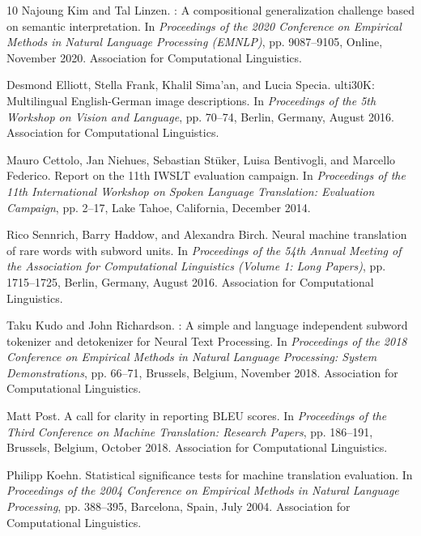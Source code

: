 \documentclass{nlp2026}
\begin{document}
\begin{thebibliography}{10}
Najoung Kim and Tal Linzen.
: A compositional generalization challenge based on semantic interpretation.
\newblock In {\em Proceedings of the 2020 Conference on Empirical Methods in Natural Language Processing ({EMNLP})}, pp. 9087--9105, Online, November 2020. Association for Computational Linguistics.

Desmond Elliott, Stella Frank, Khalil Sima{'}an, and Lucia Specia.
ulti30{K}: Multilingual {E}nglish-{G}erman image descriptions.
\newblock In {\em Proceedings of the 5th Workshop on Vision and Language}, pp. 70--74, Berlin, Germany, August 2016. Association for Computational Linguistics.

Mauro Cettolo, Jan Niehues, Sebastian St{\"u}ker, Luisa Bentivogli, and Marcello Federico.
\newblock Report on the 11th {IWSLT} evaluation campaign.
\newblock In {\em Proceedings of the 11th International Workshop on Spoken Language Translation: Evaluation Campaign}, pp. 2--17, Lake Tahoe, California, December 2014.

Rico Sennrich, Barry Haddow, and Alexandra Birch.
\newblock Neural machine translation of rare words with subword units.
\newblock In {\em Proceedings of the 54th Annual Meeting of the Association for Computational Linguistics (Volume 1: Long Papers)}, pp. 1715--1725, Berlin, Germany, August 2016. Association for Computational Linguistics.

Taku Kudo and John Richardson.
: A simple and language independent subword tokenizer and detokenizer for {Neural Text Processing}.
\newblock In {\em Proceedings of the 2018 Conference on Empirical Methods in Natural Language Processing: System Demonstrations}, pp. 66--71, Brussels, Belgium, November 2018. Association for Computational Linguistics.

Matt Post.
\newblock A call for clarity in reporting {BLEU} scores.
\newblock In {\em Proceedings of the Third Conference on Machine Translation: Research Papers}, pp. 186--191, Brussels, Belgium, October 2018. Association for Computational Linguistics.

Philipp Koehn.
\newblock Statistical significance tests for machine translation evaluation.
\newblock In {\em Proceedings of the 2004 Conference on Empirical Methods in Natural Language Processing}, pp. 388--395, Barcelona, Spain, July 2004. Association for Computational Linguistics.

\end{thebibliography}
\end{document}
